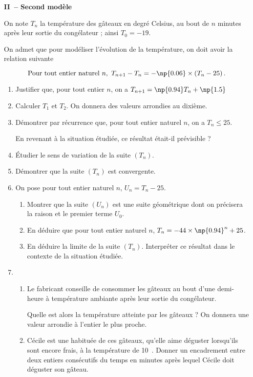 \documentclass[11pt,a4paper,french]{article}
\begin{document}
\begin{center}
\textbf{II~-- Second modèle}
\end{center}
\medskip

On note $T_n$ la température des gâteaux  en degré Celsius, au bout de $n$ minutes après leur sortie du congélateur ; ainsi $T_0 = - 19$.

On admet que pour modéliser l'évolution de la température, on doit avoir la relation suivante 

\[\text{Pour tout entier naturel } n,\ T_{n+1}-T_n=-\np{0.06}\times \left(T_n - 25\right).\]
\begin{enumerate}
\item Justifier que, pour tout entier $n$, on a $T_{n+1}=\np{0.94}T_n + \np{1.5}$
\item Calculer $T_1$ et $T_2$. On donnera des valeurs arrondies au dixième.
\item Démontrer par récurrence que, pour tout entier naturel $n$, on a $T_n\leqslant 25$.

En revenant à la situation étudiée, ce résultat était-il prévisible ?
\item Étudier le sens de  variation de la suite $\left(T_n\right)$.
\item Démontrer que la suite $\left(T_n\right)$ est convergente.
\item On pose pour tout entier naturel $n$, $U_n = T_n - 25$.
\begin{enumerate}
\item Montrer que la suite $\left(U_n\right)$ est une suite géométrique dont on précisera la raison et le premier terme $U_0$.
\item En déduire que pour tout entier naturel $n$, $T_n=-44\times \np{0.94}^n+25$.
\item En déduire la limite de la suite $\left(T_n\right)$. Interpréter ce résultat dans le contexte de la situation étudiée.
\end{enumerate}
\item 
	\begin{enumerate}
		\item Le fabricant conseille de consommer les gâteaux au bout d'une demi-heure à température ambiante après leur sortie du congélateur.
		 
Quelle est alors la température atteinte par les gâteaux ? On donnera une valeur arrondie à l'entier le plus proche.
		\item Cécile est une habituée de ces gâteaux, qu'elle aime déguster lorsqu'ils sont encore frais, à la température de 10~\textcelsius.
Donner un encadrement entre deux entiers consécutifs du temps en minutes après lequel Cécile doit déguster son gâteau.


\end{enumerate}
\end{enumerate}
\end{document}
